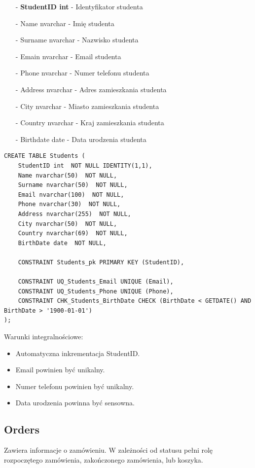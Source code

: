 \documentclass[11pt,a4paper]{article}
\begin{document}
\begin{itemize}
    \item[-] \textbf{StudentID int} - Identyfikator studenta
    \item[-] Name nvarchar - Imię studenta
    \item[-] Surname nvarchar - Nazwisko studenta
    \item[-] Emain nvarchar - Email studenta
    \item[-] Phone nvarchar - Numer telefonu studenta
    \item[-] Address nvarchar - Adres zamieszkania studenta
    \item[-] City nvarchar - Miasto zamieszkania studenta
    \item[-] Country nvarchar - Kraj zamieszkania studenta
    \item[-] Birthdate date - Data urodzenia studenta
\end{itemize}

\begin{Verbatim}[breaklines=true]
CREATE TABLE Students (
    StudentID int  NOT NULL IDENTITY(1,1),
    Name nvarchar(50)  NOT NULL,
    Surname nvarchar(50)  NOT NULL,
    Email nvarchar(100)  NOT NULL,
    Phone nvarchar(30)  NOT NULL,
    Address nvarchar(255)  NOT NULL,
    City nvarchar(50)  NOT NULL,
    Country nvarchar(69)  NOT NULL,
    BirthDate date  NOT NULL,

    CONSTRAINT Students_pk PRIMARY KEY (StudentID),

    CONSTRAINT UQ_Students_Email UNIQUE (Email),
    CONSTRAINT UQ_Students_Phone UNIQUE (Phone),
    CONSTRAINT CHK_Students_BirthDate CHECK (BirthDate < GETDATE() AND BirthDate > '1900-01-01')
);
\end{Verbatim}

Warunki integralnościowe:
\begin{itemize}
    \item Automatyczna inkrementacja StudentID.
    \item Email powinien być unikalny.
    \item Numer telefonu powinien być unikalny.
    \item Data urodzenia powinna być sensowna.
\end{itemize}

\subsection{Orders}
Zawiera informacje o zamówieniu. W zależności od statusu pełni rolę rozpoczętego zamówienia, zakończonego zamówienia, lub koszyka.
\end{document}
